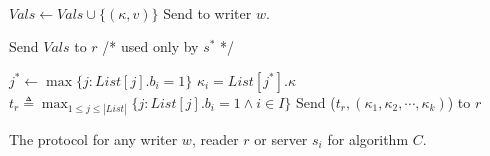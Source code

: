 \begin{algorithm*}[!ht]
\begin{algorithmic}[2]
\vspace{-1.7em}
\\\hrulefill
\vspace{-1.5em}
      \begin{multicols}{3}{\footnotesize
            \EndPart
            \Statex
             {
                       \State   $Vals \gets   Vals \cup \{({\kappa}, v)\}$ 
              \State  Send {\ackTag} to writer $w$.
            }\EndPart
            \Statex
            \EndPart
                   
                        \Statex
             {
              \State   Send $Vals$  to  $r$
            }\EndPart 
          \Statex\Statex   /* used only by $s^*$ */
          
           {
                     \State $j^* \leftarrow \max \{ j : List[j].b_i =1 \}$
                     \State ${\kappa}_i = List[j^*].{\kappa}$
           \EndFor 
             \State  $t_r \triangleq \max_{1 \leq j \leq |List|} \{ j : List[j].b_i = 1 \wedge i \in I\}$ 
            \State  Send  ($t_r, ({\kappa}_1,{\kappa}_2, \cdots, {\kappa}_k)$) to $r$
            }\EndPart       
          }\end{multicols}
        \end{algorithmic} 
        \caption{The protocol for any  writer $w$, reader $r$ or server $s_i$ for  algorithm $C$.}\label{fig:algo_c}
      \end{algorithm*}


